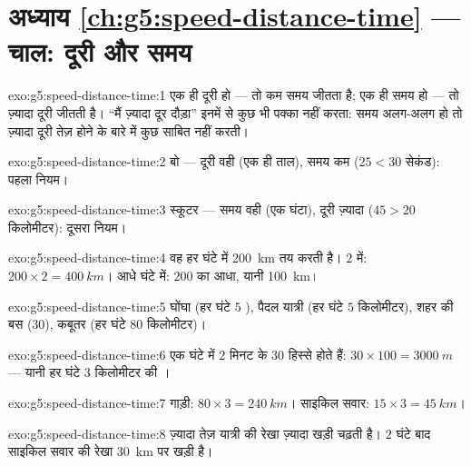 \section*{अध्याय \ref{ch:g5:speed-distance-time} --- चाल: दूरी और समय}

\begin{solution}{exo:g5:speed-distance-time:1}
एक ही दूरी हो --- तो कम समय जीतता है; एक ही समय हो --- तो ज़्यादा
दूरी जीतती है। ``मैं ज़्यादा दूर दौड़ा'' इनमें से कुछ भी पक्का नहीं
करता: समय अलग-अलग हो तो ज़्यादा दूरी तेज़ होने के बारे में कुछ साबित
नहीं करती।
\end{solution}

\begin{solution}{exo:g5:speed-distance-time:2}
बो --- दूरी वही (एक ही ताल), समय कम ($25 < 30$ सेकंड): पहला नियम।
\end{solution}

\begin{solution}{exo:g5:speed-distance-time:3}
स्कूटर --- समय वही (एक घंटा), दूरी ज़्यादा ($45 > 20$ किलोमीटर):
दूसरा नियम।
\end{solution}

\begin{solution}{exo:g5:speed-distance-time:4}
वह हर घंटे में \qty{200}{km} तय करती है। $2$  में: $200 \times
2 = \qty{400}{km}$। आधे घंटे में: $200$ का आधा, यानी \qty{100}{km}।
\end{solution}

\begin{solution}{exo:g5:speed-distance-time:5}
घोंघा (हर घंटे $5$ ), पैदल यात्री (हर घंटे $5$ किलोमीटर), शहर की
बस ($30$), कबूतर (हर घंटे $80$ किलोमीटर)।
\end{solution}

\begin{solution}{exo:g5:speed-distance-time:6}
एक घंटे में $2$ मिनट के $30$ हिस्से होते हैं: $30 \times 100 =
\qty{3000}{m}$ --- यानी हर घंटे $3$ किलोमीटर की ।
\end{solution}

\begin{solution}{exo:g5:speed-distance-time:7}
गाड़ी: $80 \times 3 = \qty{240}{km}$। साइकिल सवार: $15 \times 3 =
\qty{45}{km}$।
\end{solution}

\begin{solution}{exo:g5:speed-distance-time:8}
ज़्यादा तेज़ यात्री की रेखा ज़्यादा खड़ी चढ़ती है। $2$ घंटे बाद
साइकिल सवार की रेखा \qty{30}{km} पर खड़ी है।
\end{solution}

